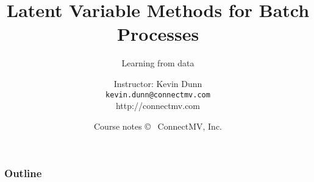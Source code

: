 \documentclass[handout, 12pt]{beamer}
\title[]{\large Latent Variable Methods for Batch Processes}
\subtitle[]{Learning from data}
\author[]{Instructor: Kevin Dunn \\{\tt kevin.dunn@connectmv.com}\\ http://connectmv.com}
\institute[]{}
\date[]{Course notes \copyright~ ConnectMV, Inc. \\ \vspace{1cm}{\footnotesize Presented at GSK, Mississauga, February 2011}}
\begin{document}
\begin{frame} \titlepage \end{frame}

%
%

\begin{frame}\frametitle{Outline}
\tableofcontents
\end{frame}


% 
% 
% 
% 
% 
% 
% 
% 
% 
% 
% 
% 
% 
% 
% 





% 
% 
% 
% 
% 
% 
\end{document}
